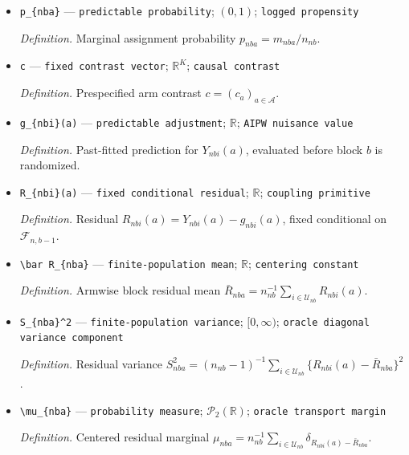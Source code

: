 \documentclass{article}
\begin{document}
\begin{itemize}
  \par\smallskip\noindent\emph{Definition.} Number of units assigned to arm \(a\) in block \(b\), with \(\sum_{a\in\mathcal A}m_{nba}=n_{nb}\).
  \item \texttt{p\_\allowbreak{}\{nba\}\allowbreak{}} --- \texttt{predictable probability}; \((0,1)\); \texttt{logged propensity}
  \par\smallskip\noindent\emph{Definition.} Marginal assignment probability \(p_{nba}=m_{nba}/n_{nb}\).
  \item \texttt{c} --- \texttt{fixed contrast vector}; \(\mathbb R^K\); \texttt{causal contrast}
  \par\smallskip\noindent\emph{Definition.} Prespecified arm contrast \(c=(c_a)_{a\in\mathcal A}\).
  \item \texttt{g\_\allowbreak{}\{nbi\}\allowbreak{}(a)} --- \texttt{predictable adjustment}; \(\mathbb R\); \texttt{AIPW nuisance value}
  \par\smallskip\noindent\emph{Definition.} Past-fitted prediction for \(Y_{nbi}(a)\), evaluated before block \(b\) is randomized.
  \item \texttt{R\_\allowbreak{}\{nbi\}\allowbreak{}(a)} --- \texttt{fixed conditional residual}; \(\mathbb R\); \texttt{coupling primitive}
  \par\smallskip\noindent\emph{Definition.} Residual \(R_{nbi}(a)=Y_{nbi}(a)-g_{nbi}(a)\), fixed conditional on \(\mathcal F_{n,b-1}\).
  \item \texttt{\textbackslash{}\allowbreak{}bar R\_\allowbreak{}\{nba\}\allowbreak{}} --- \texttt{finite-\allowbreak{}population mean}; \(\mathbb R\); \texttt{centering constant}
  \par\smallskip\noindent\emph{Definition.} Armwise block residual mean \(\bar R_{nba}=n_{nb}^{-1}\sum_{i\in\mathcal U_{nb}}R_{nbi}(a)\).
  \item \texttt{S\_\allowbreak{}\{nba\}\allowbreak{}\textasciicircum{}2} --- \texttt{finite-\allowbreak{}population variance}; \([0,\infty)\); \texttt{oracle diagonal variance component}
  \par\smallskip\noindent\emph{Definition.} Residual variance \(S_{nba}^2=(n_{nb}-1)^{-1}\sum_{i\in\mathcal U_{nb}}\{R_{nbi}(a)-\bar R_{nba}\}^2\).
  \item \texttt{\textbackslash{}\allowbreak{}mu\_\allowbreak{}\{nba\}\allowbreak{}} --- \texttt{probability measure}; \(\mathcal P_2(\mathbb R)\); \texttt{oracle transport margin}
  \par\smallskip\noindent\emph{Definition.} Centered residual marginal \(\mu_{nba}=n_{nb}^{-1}\sum_{i\in\mathcal U_{nb}}\delta_{R_{nbi}(a)-\bar R_{nba}}\).

\end{itemize}
\end{document}
